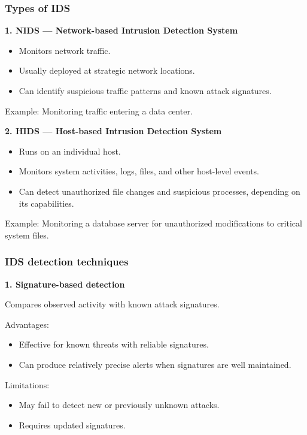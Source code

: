 \subsubsection{Types of IDS}

\textbf{1. NIDS --- Network-based Intrusion Detection System}

\begin{itemize}
\item Monitors network traffic.
\item Usually deployed at strategic network locations.
\item Can identify suspicious traffic patterns and known attack signatures.
\end{itemize}

Example: Monitoring traffic entering a data center.

\textbf{2. HIDS --- Host-based Intrusion Detection System}

\begin{itemize}
\item Runs on an individual host.
\item Monitors system activities, logs, files, and other host-level events.
\item Can detect unauthorized file changes and suspicious processes, depending on its capabilities.
\end{itemize}

Example: Monitoring a database server for unauthorized modifications to critical system files.

\subsubsection{IDS detection techniques}

\textbf{1. Signature-based detection}

Compares observed activity with known attack signatures.

Advantages:

\begin{itemize}
\item Effective for known threats with reliable signatures.
\item Can produce relatively precise alerts when signatures are well maintained.
\end{itemize}

Limitations:

\begin{itemize}
\item May fail to detect new or previously unknown attacks.
\item Requires updated signatures.
\end{itemize}

